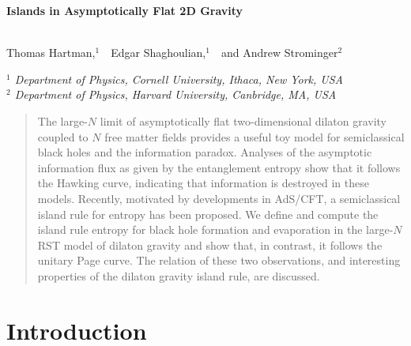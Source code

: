 \documentclass[12pt,oneside,letterpaper]{article}
\numberwithin{equation}{section}
\begin{document}
\begin{center}

{\LARGE \bf { Islands in Asymptotically Flat 2D  Gravity
\\
\ \\
}}

\vskip10mm

Thomas Hartman,$^{1}$\ \ Edgar Shaghoulian,$^{1}$\ \  and Andrew Strominger$^{2}$

\vskip5mm

{\it $^1$ Department of Physics, Cornell University, Ithaca, New York, USA
}  \\
{\it $^2$ Department of Physics, Harvard University, Canbridge, MA, USA } 
\vskip5mm


\vskip5mm





\end{center}

\vspace{4mm}
\begin{abstract}
\noindent
The large-$N$ limit of asymptotically flat two-dimensional dilaton gravity coupled to $N$ free matter 
fields provides a useful toy model for semiclassical black holes and the information paradox. Analyses of the asymptotic information 
flux as given by the entanglement entropy  show that it follows the Hawking curve, indicating that information is destroyed in these models. Recently, motivated by developments in AdS/CFT, a semiclassical  island rule for entropy has been
proposed. We define and compute the island rule entropy for black hole formation and evaporation in the large-$N$  RST model of dilaton gravity and show that, in 
contrast, it follows the unitary Page curve. The relation of these two observations, and interesting properties of the dilaton gravity island rule, are discussed. 
 
 \end{abstract}


\pagebreak
\pagestyle{plain}

\setcounter{tocdepth}{2}
{}
\vfill
\tableofcontents

\newpage

\section{Introduction}
\end{document}
